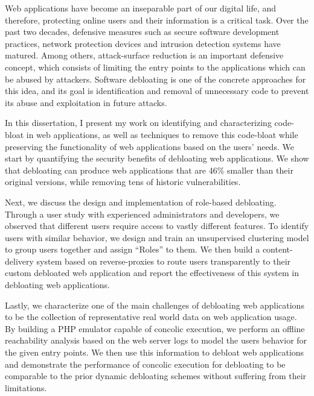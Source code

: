 Web applications have become an inseparable part of our digital life, and therefore, protecting online users and their information is a critical task. 
Over the past two decades, defensive measures such as secure software development practices, network protection devices and intrusion detection systems have matured. 
Among others, attack-surface reduction is an important defensive concept, which consists of limiting the entry points to the applications which can be abused by attackers. 
Software debloating is one of the concrete approaches for this idea, and its goal is identification and removal of unnecessary code to prevent its abuse and exploitation in future attacks. 

In this dissertation, I present my work on identifying and characterizing code-bloat in web applications, as well as techniques to remove this code-bloat while preserving the functionality of web applications based on the users' needs.
We start by quantifying the security benefits of debloating web applications. We show that debloating can produce web applications that are 46\% smaller than their original versions, while removing tens of historic vulnerabilities. 

Next, we discuss the design and implementation of role-based debloating.
Through a user study with experienced administrators and developers, we observed that different users require access to vastly different features.
To identify users with similar behavior, we design and train an unsupervised clustering model to group users together and assign ``Roles'' to them. 
We then build a content-delivery system based on reverse-proxies to route users transparently to their custom debloated web application and report the effectiveness of this system in debloating web applications. 

Lastly, we characterize one of the main challenges of debloating web applications to be the collection of representative real world data on web application usage. By building a PHP emulator capable of concolic execution, we perform an offline reachability analysis based on the web server logs to model the users behavior for the given entry points. We then use this information to debloat web applications and demonstrate the performance of concolic execution for debloating to be comparable to the prior dynamic debloating schemes without suffering from their limitations.